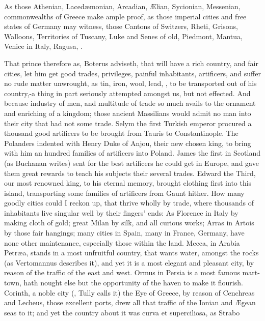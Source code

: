 {As those Athenian, Laced\ae{}monian, Arcadian, \AE{}lian, Sycionian,
Messenian, \etc{} commonwealths of Greece make ample proof, as those
imperial cities and free states of Germany may witness, those Cantons
of Switzers, Rheti, Grisons, Walloons, Territories of Tuscany, Luke and
Senes of old, Piedmont, Mantua, Venice in Italy, Ragusa, \etc{}.

That prince therefore as, Boterus adviseth, that will have a rich
country, and fair cities, let him get good trades, privileges, painful
inhabitants, artificers, and suffer no rude matter unwrought, as tin,
iron, wool, lead, \etc{}, to be transported out of his country,-a
thing in part seriously attempted amongst us, but not effected. And
because industry of men, and multitude of trade so much avails to the
ornament and enriching of a kingdom; those ancient Massilians
would admit no man into their city that had not some trade. Selym the
first Turkish emperor procured a thousand good artificers to be brought
from Tauris to Constantinople. The Polanders indented with Henry Duke
of Anjou, their new chosen king, to bring with him an hundred families
of artificers into Poland. James the first in Scotland (as
Buchanan writes) sent for the best artificers he could get in
Europe, and gave them great rewards to teach his subjects their several
trades. Edward the Third, our most renowned king, to his eternal
memory, brought clothing first into this island, transporting some
families of artificers from Gaunt hither. How many goodly cities could
I reckon up, that thrive wholly by trade, where thousands of
inhabitants live singular well by their fingers' ends: As Florence in
Italy by making cloth of gold; great Milan by silk, and all curious
works; Arras in Artois by those fair hangings; many cities in Spain,
many in France, Germany, have none other maintenance, especially those
within the land. Mecca, in Arabia Petr\ae{}a, stands in a most
unfruitful country, that wants water, amongst the rocks (as Vertomannus
describes it), and yet it is a most elegant and pleasant city, by
reason of the traffic of the east and west. Ormus in Persia is a most
famous mart-town, hath nought else but the opportunity of the haven to
make it flourish. Corinth, a noble city (, Tully calls it)
the Eye of Greece, by reason of Cenchreas and Lecheus, those excellent
ports, drew all that traffic of the Ionian and \AE{}gean seas to it; and
yet the country about it was curva et superciliosa, as Strabo
}
